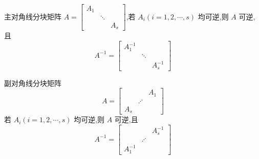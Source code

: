 \documentclass[UTF8]{ctexart}
\theoremstyle{remark}
\begin{document}
	主对角线分块矩阵 \(A = 
	\begin{bmatrix}
		A_1 & & \\
		& \ddots & \\
		& & A_s
	\end{bmatrix}\),若 \(A_i (i = 1,2,\cdots,s)\) 均可逆,则 \(A\) 可逆,且
	\[
	A^{-1} = 
	\begin{bmatrix}
		A_1^{-1} & & \\
		& \ddots & \\
		& & A_s^{-1}
	\end{bmatrix}
	\]
	
	副对角线分块矩阵
	\[
	A = 
	\begin{bmatrix}
		& & A_1 \\
		& \iddots & \\
		A_s & & 
	\end{bmatrix}
	\]
	若 \(A_i (i = 1,2,\cdots,s)\) 均可逆,则 \(A\) 可逆,且
	\[
	A^{-1} = 
	\begin{bmatrix}
		& & A_s^{-1} \\
		& \iddots & \\
		A_1^{-1} & & 
	\end{bmatrix}
	\]
	
\end{document}
